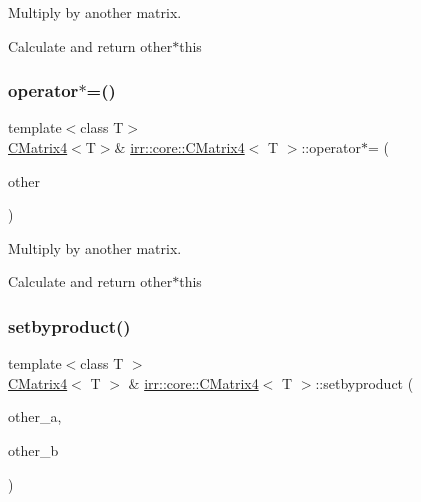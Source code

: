 Multiply by another matrix. 

Calculate and return other$\ast$this \mbox{\label{classirr_1_1core_1_1CMatrix4_a223e7cefd4428f57affb0713bd849e46}} 
\subsubsection{\texorpdfstring{operator$\ast$=()}{operator*=()}\hspace{0.1cm}{\footnotesize\ttfamily [2/2]}}
{\footnotesize\ttfamily template$<$class T$>$ \\
\hyperlink{classirr_1_1core_1_1CMatrix4}{C\+Matrix4}$<$T$>$\& \hyperlink{classirr_1_1core_1_1CMatrix4}{irr\+::core\+::\+C\+Matrix4}$<$ T $>$\+::operator$\ast$= (\begin{DoxyParamCaption}\item[{const \hyperlink{classirr_1_1core_1_1CMatrix4}{C\+Matrix4}$<$ T $>$ \&}]{other }\end{DoxyParamCaption})}



Multiply by another matrix. 

Calculate and return other$\ast$this \mbox{\label{classirr_1_1core_1_1CMatrix4_a8503c58913ba9407ba00b173d8a3e25c}} 
\subsubsection{\texorpdfstring{setbyproduct()}{setbyproduct()}\hspace{0.1cm}{\footnotesize\ttfamily [1/2]}}
{\footnotesize\ttfamily template$<$class T $>$ \\
\hyperlink{classirr_1_1core_1_1CMatrix4}{C\+Matrix4}$<$ T $>$ \& \hyperlink{classirr_1_1core_1_1CMatrix4}{irr\+::core\+::\+C\+Matrix4}$<$ T $>$\+::setbyproduct (\begin{DoxyParamCaption}\item[{const \hyperlink{classirr_1_1core_1_1CMatrix4}{C\+Matrix4}$<$ T $>$ \&}]{other\+\_\+a,  }\item[{const \hyperlink{classirr_1_1core_1_1CMatrix4}{C\+Matrix4}$<$ T $>$ \&}]{other\+\_\+b }\end{DoxyParamCaption})\hspace{0.3cm}{\ttfamily [inline]}}



